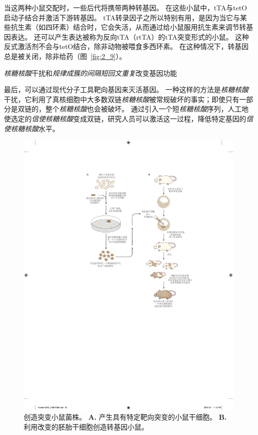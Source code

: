 \begin{proposition}[在实验动物中产生突变]
	\quad \quad 当这两种小鼠交配时，一些后代将携带两种转基因。
	在这些小鼠中，tTA与tetO启动子结合并激活下游转基因。
	tTA转录因子之所以特别有用，是因为当它与某些抗生素（如四环素）结合时，它会失活，从而通过给小鼠服用抗生素来调节转基因表达。
	还可以产生表达被称为反向tTA（rtTA）的tTA突变形式的小鼠。
	这种反式激活剂不会与tetO结合，除非动物被喂食多西环素。
	在这种情况下，转基因总是被关闭，除非给药（图~\ref{fig:2_9}）。
	
	\quad \quad \textit{核糖核酸}干扰和\textit{规律成簇的间隔短回文重复}改变基因功能
	
	\quad \quad 最后，可以通过现代分子工具靶向基因来灭活基因。
	一种这样的方法是\textit{核糖核酸}干扰，它利用了真核细胞中大多数双链\textit{核糖核酸}被常规破坏的事实；即使只有一部分是双链的，整个\textit{核糖核酸}也会被破坏。
	通过引入一个短\textit{核糖核酸}序列，人工地使选定的\textit{信使核糖核酸}变成双链，研究人员可以激活这一过程，降低特定基因的\textit{信使核糖核酸}水平。
	
\end{proposition}


\begin{figure}[htbp]
	\centering
	\includegraphics[width=0.8\linewidth]{chap02/fig_2_7}
	\caption{创造突变小鼠菌株\cite{alberts2017molecular}。
		\textbf{A.} 产生具有特定靶向突变的小鼠干细胞。
		\textbf{B.} 利用改变的胚胎干细胞创造转基因小鼠。}
	\label{fig:2_7}
\end{figure}


